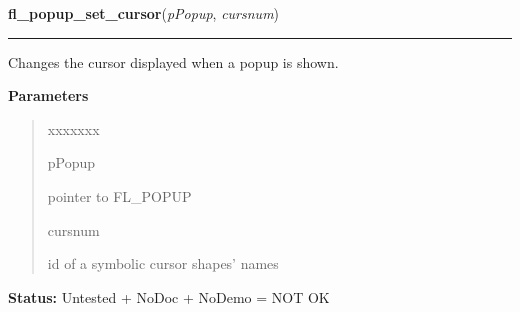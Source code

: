 \hspace{.8\funcindent}\begin{boxedminipage}{\funcwidth}

    \raggedright \textbf{fl\_popup\_set\_cursor}(\textit{pPopup}, \textit{cursnum})

    \vspace{-1.5ex}

    \rule{\textwidth}{0.5\fboxrule}
\setlength{\parskip}{2ex}
    Changes the cursor displayed when a popup is shown.

\setlength{\parskip}{1ex}
      \textbf{Parameters}
      \vspace{-1ex}

      \begin{quote}
        \begin{Ventry}{xxxxxxx}

          \item[pPopup]

          pointer to FL\_POPUP

          \item[cursnum]

          id of a symbolic cursor shapes' names

        \end{Ventry}

      \end{quote}

\textbf{Status:} Untested + NoDoc + NoDemo = NOT OK



    \end{boxedminipage}

    \label{xformslib:library:fl_popup_get_title}

    \vspace{0.5ex}

